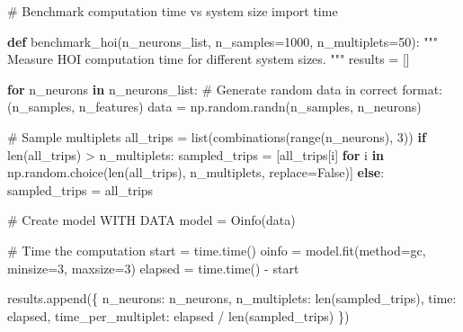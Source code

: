 \documentclass[
  11pt,
  letterpaper,
  oneside,
  openany]{book}
\newenvironment{Shaded}{\begin{snugshade}}{\end{snugshade}}
\newcommand{\BuiltInTok}[1]{\textcolor[rgb]{0.00,0.23,0.31}{#1}}
\newcommand{\CommentTok}[1]{\textcolor[rgb]{0.37,0.37,0.37}{#1}}
\newcommand{\ControlFlowTok}[1]{\textcolor[rgb]{0.00,0.23,0.31}{\textbf{#1}}}
\newcommand{\DecValTok}[1]{\textcolor[rgb]{0.68,0.00,0.00}{#1}}
\newcommand{\ImportTok}[1]{\textcolor[rgb]{0.00,0.46,0.62}{#1}}
\newcommand{\KeywordTok}[1]{\textcolor[rgb]{0.00,0.23,0.31}{\textbf{#1}}}
\newcommand{\NormalTok}[1]{\textcolor[rgb]{0.00,0.23,0.31}{#1}}
\newcommand{\OperatorTok}[1]{\textcolor[rgb]{0.37,0.37,0.37}{#1}}
\newcommand{\StringTok}[1]{\textcolor[rgb]{0.13,0.47,0.30}{#1}}
\newcommand{\VariableTok}[1]{\textcolor[rgb]{0.07,0.07,0.07}{#1}}
\begin{document}
\begin{Shaded}
\begin{Highlighting}[]
\CommentTok{\# Benchmark computation time vs system size}
\ImportTok{import}\NormalTok{ time}

\KeywordTok{def}\NormalTok{ benchmark\_hoi(n\_neurons\_list, n\_samples}\OperatorTok{=}\DecValTok{1000}\NormalTok{, n\_multiplets}\OperatorTok{=}\DecValTok{50}\NormalTok{):}
    \CommentTok{"""}
\CommentTok{    Measure HOI computation time for different system sizes.}
\CommentTok{    """}
\NormalTok{    results }\OperatorTok{=}\NormalTok{ []}
    
    \ControlFlowTok{for}\NormalTok{ n\_neurons }\KeywordTok{in}\NormalTok{ n\_neurons\_list:}
        \CommentTok{\# Generate random data in correct format: (n\_samples, n\_features)}
\NormalTok{        data }\OperatorTok{=}\NormalTok{ np.random.randn(n\_samples, n\_neurons)}
        
        \CommentTok{\# Sample multiplets}
\NormalTok{        all\_trips }\OperatorTok{=} \BuiltInTok{list}\NormalTok{(combinations(}\BuiltInTok{range}\NormalTok{(n\_neurons), }\DecValTok{3}\NormalTok{))}
        \ControlFlowTok{if} \BuiltInTok{len}\NormalTok{(all\_trips) }\OperatorTok{\textgreater{}}\NormalTok{ n\_multiplets:}
\NormalTok{            sampled\_trips }\OperatorTok{=}\NormalTok{ [all\_trips[i] }\ControlFlowTok{for}\NormalTok{ i }\KeywordTok{in} 
\NormalTok{                           np.random.choice(}\BuiltInTok{len}\NormalTok{(all\_trips), n\_multiplets, replace}\OperatorTok{=}\VariableTok{False}\NormalTok{)]}
        \ControlFlowTok{else}\NormalTok{:}
\NormalTok{            sampled\_trips }\OperatorTok{=}\NormalTok{ all\_trips}
        
        \CommentTok{\# Create model WITH DATA}
\NormalTok{        model }\OperatorTok{=}\NormalTok{ Oinfo(data)}
        
        \CommentTok{\# Time the computation}
\NormalTok{        start }\OperatorTok{=}\NormalTok{ time.time()}
\NormalTok{        oinfo }\OperatorTok{=}\NormalTok{ model.fit(method}\OperatorTok{=}\StringTok{\textquotesingle{}gc\textquotesingle{}}\NormalTok{, minsize}\OperatorTok{=}\DecValTok{3}\NormalTok{, maxsize}\OperatorTok{=}\DecValTok{3}\NormalTok{)}
\NormalTok{        elapsed }\OperatorTok{=}\NormalTok{ time.time() }\OperatorTok{{-}}\NormalTok{ start}
        
\NormalTok{        results.append(\{}
            \StringTok{\textquotesingle{}n\_neurons\textquotesingle{}}\NormalTok{: n\_neurons,}
            \StringTok{\textquotesingle{}n\_multiplets\textquotesingle{}}\NormalTok{: }\BuiltInTok{len}\NormalTok{(sampled\_trips),}
            \StringTok{\textquotesingle{}time\textquotesingle{}}\NormalTok{: elapsed,}
            \StringTok{\textquotesingle{}time\_per\_multiplet\textquotesingle{}}\NormalTok{: elapsed }\OperatorTok{/} \BuiltInTok{len}\NormalTok{(sampled\_trips)}
\NormalTok{        \})}
    

\end{Highlighting}
\end{Shaded}
\end{document}
